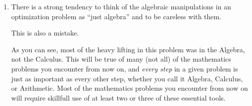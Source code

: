 \begin{myexample}
\begin{enumerate}
    \centerline{\bf{} This is a mistake.}

    Don't misunderstand us. Intuition is important. Very
    important. It is especially so when you first start thinking about
    a new problem. Use your intuition.

    But intuition is based on past experience. It is a way of saying
    that you expect today to go pretty much the same way yesterday
    did. Most of the time this is true, but you can't always count on
    it. Sometimes things don't go the way you expect and you never
    know when things will go awry so you \alert{must} verify that your
    intuition by some other means. (Calculus, in this case.)

    \begin{embeddedproblem}
      For example, it seems fairly intuitively clear that the minimal
      square occurs when the line through $(2,3)$ is orthogonal
      (perpendicular) to the graph of the line $5x+3y=2$.
      \begin{enumerate}[label={\bf{}(\alph*)}]
        \item Verify that our intuition is correct.
        \item Is it also true if the point on the line is not adjacent
          to $(2,3)$?
      \end{enumerate}
    \end{embeddedproblem}
    
  \item  There is a strong tendency to think of the algebraic
    manipulations in an optimization problem as ``just algebra'' and to
    be careless with them.

    \centerline{\alert{This is also a mistake.}}

    As you can see, most of the heavy lifting in this problem was in
    the Algebra, not the Calculus. This will be true of many (not all)
    of the mathematics problems you encounter from now on, and
    \emph{every step} in a given problem is just as important as every
    other step, whether you call it Algebra, Calculus, or Arithmetic.
    Most of the mathematics problems you encounter from now on will
    require skillfull use of at least two or three of these essential
    tools.



\end{enumerate}
\end{myexample}
